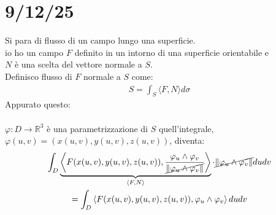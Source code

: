\documentclass[a4paper, oneside]{article}
\begin{document}
\section{9/12/25}
\begin{definition}
  Si para di flusso di un campo lungo una superficie.\\
   io ho un campo $F$ definito in un intorno di una superficie orientabile e\\
   $N$ è una scelta del vettore normale a $S$.\\
  Definisco flusso di $F$ normale a $S$ come:
  \begin{gather*}
    S = \int_S \langle F, N \rangle d \sigma
  \end{gather*}
  Appurato questo:\\
  \hfill\\
   $\varphi : D \to \mathbb{R}^3$ è una parametrizzazione di $S$ quell'integrale, \\
   $\varphi(u,v) = (x(u,v), y(u,v), z(u,v))$, diventa:
  \begin{gather*}
    \int_D \underbrace{\left\langle F(x(u,v), y(u,v), z(u,v)) , \frac{\varphi_u \land \varphi_v}{\cancel{\left\lVert \varphi_u \land \varphi_v \right\rVert}}\right\rangle }_{\left\langle F,N \right\rangle } \cdot \cancel{\left\lVert \varphi_u \land \varphi_v \right\rVert} dudv\\
    = \int_D \left\langle F(x(u,v), y(u,v), z(u,v)) , \varphi_u \land \varphi_v \right\rangle dudv
  \end{gather*}
\end{definition}
\end{document}
